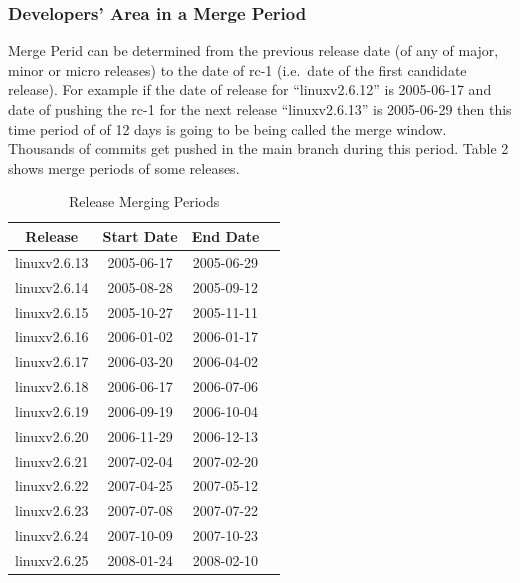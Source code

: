 \documentclass{acm_proc_article-sp}
\begin{document}
\subsubsection{Developers' Area in a Merge Period}
Merge Perid can be determined from the previous release date (of any of major, minor or micro releases) to the date of rc-1 (i.e.\ date of the first candidate release). For example if the date of release for ``linuxv2.6.12''  is 2005-06-17 and date of pushing the rc-1 for the next release ``linuxv2.6.13'' is 2005-06-29 then this time period of of 12 days is going to be being called the merge window. Thousands of commits get pushed in the main branch during this period. Table 2 shows merge periods of some releases.

\begin{table}[ht]
\caption{Release Merging Periods}  %
\centering 						%
\begin{tabular}{c c c c}				%
\hline\hline						%
Release 			& Start Date		& End Date \\ [0.5ex]
\hline 							%
linuxv2.6.13		& 2005-06-17	& 2005-06-29 \\
linuxv2.6.14		& 2005-08-28	& 2005-09-12 \\
linuxv2.6.15		& 2005-10-27	& 2005-11-11 \\
linuxv2.6.16		& 2006-01-02	& 2006-01-17 \\
linuxv2.6.17		& 2006-03-20	& 2006-04-02 \\
linuxv2.6.18		& 2006-06-17	& 2006-07-06 \\
linuxv2.6.19		& 2006-09-19	& 2006-10-04 \\
linuxv2.6.20  		& 2006-11-29	& 2006-12-13 \\
linuxv2.6.21		& 2007-02-04	& 2007-02-20 \\
linuxv2.6.22		& 2007-04-25	& 2007-05-12 \\
linuxv2.6.23		& 2007-07-08	& 2007-07-22 \\
linuxv2.6.24		& 2007-10-09	& 2007-10-23 \\
linuxv2.6.25		& 2008-01-24	& 2008-02-10 \\
[1ex]							%
\hline 							%
\end{tabular}
\label{table:nonlin} 				%
\end{table}
\end{document}
